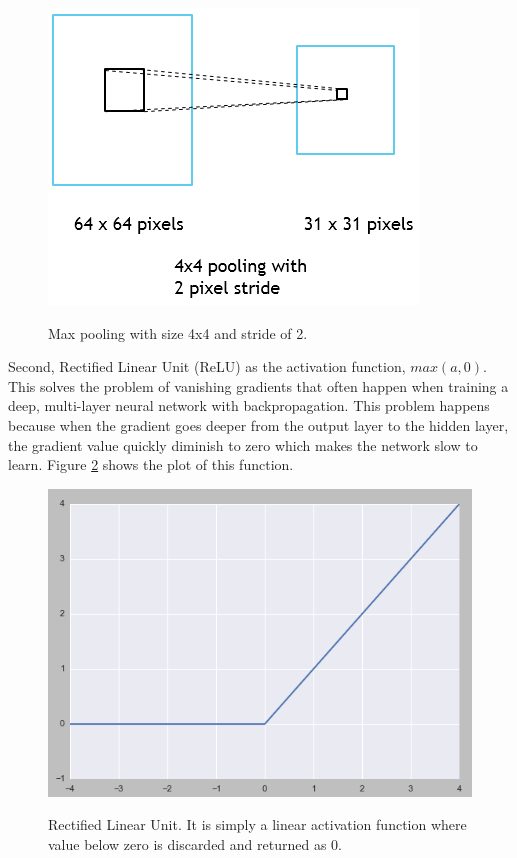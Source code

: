 \documentclass[a4paper,11pt]{kth-mag}
\begin{document}
\begin{figure}[h]
\centering
\includegraphics[scale=0.5]{image/pooling.png}
\label{fig:pooling}
\caption{Max pooling with size 4x4 and stride of 2.}
\end{figure}

Second, Rectified Linear Unit (ReLU) as the activation function, $max(a, 0)$. This solves the problem of vanishing gradients that often happen when training a deep, multi-layer neural network with backpropagation. This problem happens because when the gradient goes deeper from the output layer to the hidden layer, the gradient value quickly diminish to zero which makes the network slow to learn. Figure \ref{fig:relu} shows the plot of this function.

\begin{figure}[h]
\centering
\includegraphics[scale=0.5]{image/relu.png}
\label{fig:relu}
\caption{Rectified Linear Unit. It is simply a linear activation function where value below zero is discarded and returned as 0.}
\end{figure}
\end{document}
